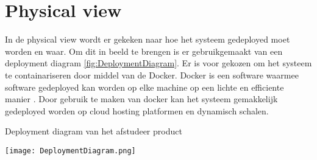 \section{Physical view}
In de physical view wordt er gekeken naar hoe het systeem gedeployed moet worden en waar.
Om dit in beeld te brengen is er gebruikgemaakt van een deployment diagram \ref{fig:DeploymentDiagram}.
Er is voor gekozen om het systeem te containariseren door middel van de Docker.
Docker is een software waarmee software gedeployed kan worden op elke machine op een lichte en efficiente manier \Parencite{Docker}.
Door gebruik te maken van docker kan het systeem gemakkelijk gedeployed worden op cloud hosting platformen en dynamisch schalen.

\whitespace
\begin{graphic}
    \captionsetup{type=figure}
    \caption{Deployment diagram van het afstudeer product}
    \texttt{[image: DeploymentDiagram.png]}
    \label{fig:DeploymentDiagram}
\end{graphic}

